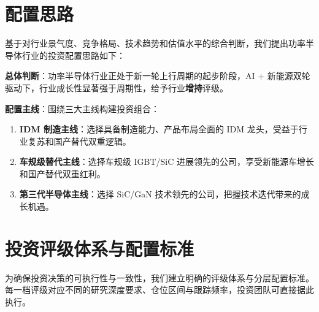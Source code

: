 
\section{配置思路}

基于对行业景气度、竞争格局、技术趋势和估值水平的综合判断，我们提出功率半导体行业的投资配置思路如下：

\vspace{0.3em}

\textbf{总体判断}：功率半导体行业正处于新一轮上行周期的起步阶段，AI + 新能源双轮驱动下，行业成长性显著强于周期性，给予行业\textbf{增持}评级。

\vspace{0.3em}

\textbf{配置主线}：围绕三大主线构建投资组合：
\begin{enumerate}[leftmargin=2em]
\item \textbf{IDM 制造主线}：选择具备制造能力、产品布局全面的 IDM 龙头，受益于行业复苏和国产替代双重逻辑。
\item \textbf{车规级替代主线}：选择车规级 IGBT/SiC 进展领先的公司，享受新能源车增长和国产替代双重红利。
\item \textbf{第三代半导体主线}：选择 SiC/GaN 技术领先的公司，把握技术迭代带来的成长机遇。
\end{enumerate}

\section{投资评级体系与配置标准}

为确保投资决策的可执行性与一致性，我们建立明确的评级体系与分层配置标准。每一档评级对应不同的研究深度要求、仓位区间与跟踪频率，投资团队可直接据此执行。

